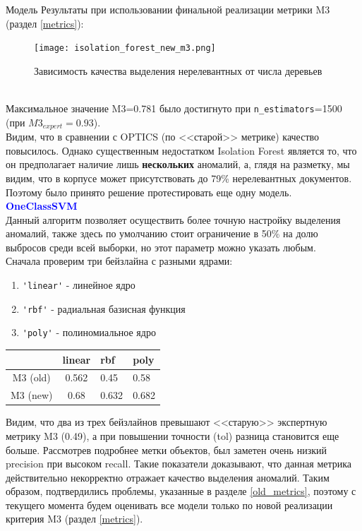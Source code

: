 \documentclass{article}
\begin{document}
\begin{section}{Модель}
Результаты при использовании финальной реализации метрики M3 (раздел \textcolor{cyan}{\ref{metrics}}):
\begin{figure}[!htb]
    \center
        \texttt{[image: isolation\_forest\_new\_m3.png]}
        \caption{Зависимость качества выделения нерелевантных от числа деревьев}
\end{figure}\\
Максимальное значение M3=0.781 было достигнуто при \verb|n_estimators|=1500 (при $M3_{expert}=0.93$).\\

Видим, что в сравнении с OPTICS (по <<старой>> метрике) качество повысилось. Однако существенным недостатком Isolation Forest является то, что он предполагает наличие лишь \textbf{нескольких} аномалий, а, глядя на разметку, мы видим, что в корпусе может присутствовать до 79\% нерелевантных документов. Поэтому было принято решение протестировать еще одну модель.\\

\textbf{\textcolor{blue}{OneClassSVM}}\\
Данный алгоритм позволяет осуществить более точную настройку выделения аномалий, также здесь по умолчанию стоит ограничение в 50\% на долю выбросов среди всей выборки, но этот параметр можно указать любым.\\

Сначала проверим три бейзлайна с разными ядрами:
\begin{enumerate}
    \item \verb|'linear'| - линейное ядро
    \item \verb|'rbf'| - радиальная базисная функция
    \item \verb|'poly'| - полиномиальное ядро
\end{enumerate}

\begin{table}[!htb]
    \center
    \begin{tabular}{|c|c|l|l|}
    \hline
             & linear & rbf   & poly  \\ \hline
    M3 (old) & 0.562  & 0.45  & 0.58  \\ \hline
    M3 (new) & 0.68   & 0.632 & 0.682 \\ \hline
    \end{tabular}
\end{table}
 Видим, что два из трех бейзлайнов превышают <<старую>> экспертную метрику M3 (0.49), а при повышении точности (tol) разница становится еще больше. Рассмотрев подробнее метки объектов, был заметен очень низкий precision при высоком recall. Такие показатели доказывают, что данная метрика действительно некорректно отражает качество выделения аномалий. Таким образом, подтвердились проблемы, указанные в разделе \textcolor{cyan}{\ref{old_metrics}}, поэтому с текущего момента будем оценивать все модели только по новой реализации критерия M3 (раздел \textcolor{cyan}{\ref{metrics}}).\\


\end{section}
\end{document}
